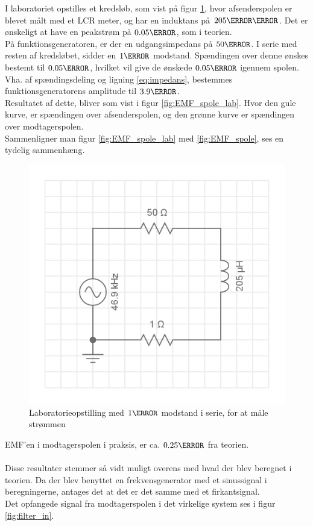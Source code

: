 I laboratoriet opstilles et kredsløb, som vist på figur \ref{fig:kredslob_spole}, hvor afsenderspolen er blevet målt med et LCR meter, og har en induktans på $205\micro\henry$.
Det er ønskeligt at have en peakstrøm på $0.05 \ampere$, som i teorien.\\
På funktionsgeneratoren, er der en udgangsimpedans på $50\ohm$.
I serie med resten af kredsløbet, sidder en $1\ohm$ modstand. Spændingen over denne ønskes bestemt til $0.05\volt$, hvilket vil give de ønskede $0.05\ampere$ igennem spolen.
Vha. af spændingsdeling og ligning \ref{eq:impedans}, bestemmes funktionsgeneratorens amplitude til $3.9\volt$.\\
Resultatet af dette, bliver som vist i figur \ref{fig:EMF_spole_lab}.
Hvor den gule kurve, er spændingen over afsenderspolen, og den grønne kurve er spændingen over modtagerspolen.\\
Sammenligner man figur \ref{fig:EMF_spole_lab} med \ref{fig:EMF_spole}, ses en tydelig sammenhæng.\\
\begin{figure}
	\centering
	\includegraphics[width=.5\textwidth]{billeder/circuit_spole.png}
	\caption{Laboratorieopstilling med $1\ohm$ modstand i serie, for at måle strømmen}
	\label{fig:kredslob_spole}
\end{figure}
EMF'en i modtagerspolen i praksis, er ca. $0.25\volt$ fra teorien.\\ \\
Disse resultater stemmer så vidt muligt overens med hvad der blev beregnet i teorien. Da der blev benyttet en frekvensgenerator med et sinussignal i beregningerne, antages det at det er det samme med et firkantsignal. \\
Det opfangede signal fra modtagerspolen i det virkelige system ses i figur \ref{fig:filter_in}.

